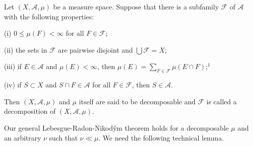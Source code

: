 Let $(X, \mathcal{A}, \mu)$ be a measure space. Suppose that there is a subfamily $\mathcal{F}$ of $\mathcal{A}$ with the following properties:

(i) $0 \leq \mu(F) < \infty$ for all $F \in \mathcal{F}$;

(ii) the sets in $\mathcal{F}$ are pairwise disjoint and $\bigcup \mathcal{F} = X$;

(iii) if $E \in \mathcal{A}$ and $\mu(E) < \infty$, then $\mu(E) = \sum_{F \in \mathcal{F}} \mu(E \cap F)$;$^1$

(iv) if $S \subset X$ and $S \cap F \in \mathcal{A}$ for all $F \in \mathcal{F}$, then $S \in \mathcal{A}$.

Then $(X, \mathcal{A}, \mu)$ and $\mu$ itself are said to be decomposable and $\mathcal{F}$ is called a decomposition of $(X, \mathcal{A}, \mu)$.

Our general Lebesgue-Radon-Nikodým theorem holds for a decomposable $\mu$ and an arbitrary $\nu$ such that $\nu \ll \mu$. We need the following technical lemma.